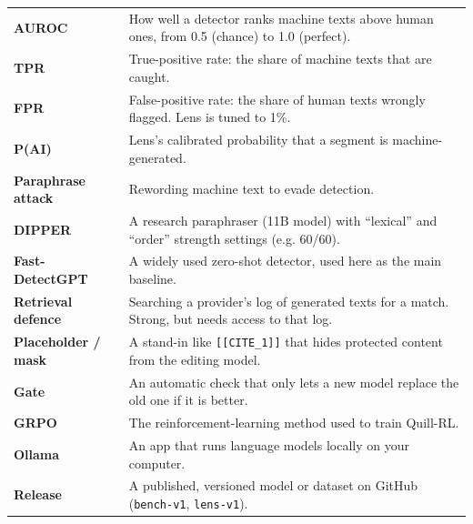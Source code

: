 \documentclass[11pt]{article}
\newcommand{\cm}[1]{\texttt{#1}}
\begin{document}
\begin{tabularx}{\linewidth}{@{}>{\bfseries}l X@{}}
\toprule
AUROC & How well a detector ranks machine texts above human ones, from 0.5 (chance) to 1.0 (perfect). \\
TPR & True-positive rate: the share of machine texts that are caught. \\
FPR & False-positive rate: the share of human texts wrongly flagged. Lens is tuned to 1\%. \\
P(AI) & Lens's calibrated probability that a segment is machine-generated. \\
Paraphrase attack & Rewording machine text to evade detection. \\
DIPPER & A research paraphraser (11B model) with ``lexical'' and ``order'' strength settings (e.g. 60/60). \\
Fast-DetectGPT & A widely used zero-shot detector, used here as the main baseline. \\
Retrieval defence & Searching a provider's log of generated texts for a match. Strong, but needs access to that log. \\
Placeholder / mask & A stand-in like \cm{[[CITE\_1]]} that hides protected content from the editing model. \\
Gate & An automatic check that only lets a new model replace the old one if it is better. \\
GRPO & The reinforcement-learning method used to train Quill-RL. \\
Ollama & An app that runs language models locally on your computer. \\
Release & A published, versioned model or dataset on GitHub (\cm{bench-v1}, \cm{lens-v1}). \\
\bottomrule
\end{tabularx}
\end{document}
